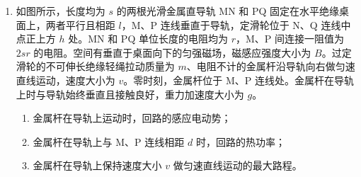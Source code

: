 \documentclass[\gkver]{gaokaozhenti}
\begin{document}
\begin{enumerate}
{由于微粒与极板碰撞前后瞬间机械能不变，碰撞后电性与极板相同，所带电荷量的绝对值不变，设微粒碰后第一次到达上极板时的速度大小为 $v_{2}$，满足 $v_{2}^{2} - v_{1}^{2} = 2ad$

代入解得 $v_{2} = \sqrt{\frac{3qEd}{m}}$

同理可得微粒第一次从上极板回到 O 点时的速度大小为 $v_{3}$，满足 $v_{3}^{2} - v_{2}^{2} = 2a\frac{d}{2}$

代入解得 $v_{3} = 2\sqrt{\frac{qEd}{m}}$

故微粒第一次从上极板回到 O 点时的动量大小为 $p = mv_{3} = 2\sqrt{qEmd}$
}

\item
如图所示，长度均为 $s$ 的两根光滑金属直导轨 MN 和 PQ 固定在水平绝缘桌面上，两者平行且相距 $l$，M、P 连线垂直于导轨，定滑轮位于 N、Q 连线中点正上方 $h$ 处。MN 和 PQ 单位长度的电阻均为 $r$，M、P 间连接一阻值为 $2sr$ 的电阻。空间有垂直于桌面向下的匀强磁场，磁感应强度大小为 $B$。过定滑轮的不可伸长绝缘轻绳拉动质量为 $m$、电阻不计的金属杆沿导轨向右做匀速直线运动，速度大小为 $v$。零时刻，金属杆位于 M、P 连线处。金属杆在导轨上时与导轨始终垂直且接触良好，重力加速度大小为 $g$。
\begin{enumerate}
	\item
	金属杆在导轨上运动时，回路的感应电动势；
	\item
	金属杆在导轨上与 M、P 连线相距 $d$ 时，回路的热功率；
	\item
	金属杆在导轨上保持速度大小 $v$ 做匀速直线运动的最大路程。
\end{enumerate}


\end{enumerate}
\end{document}
